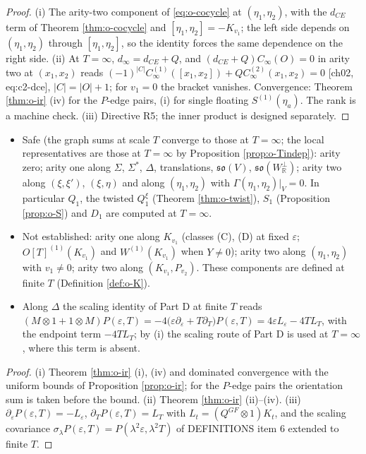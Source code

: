\begin{proof}
(i) The arity-two component of \eqref{eq:o-cocycle} at $(\eta_1,\eta_2)$, with the $d_{CE}$ term of Theorem \ref{thm:o-cocycle} and $[\eta_1,\eta_2]=-K_{v_1}$; the left side depends on $(\eta_1,\eta_2)$ through $[\eta_1,\eta_2]$, so the identity forces the same dependence on the right side. (ii) At $T=\infty$, $d_\infty=d_{CE}+Q$, and $(d_{CE}+Q)C_\infty(O)=0$ in arity two at $(x_1,x_2)$ reads $(-1)^{|C|}C_\infty^{(1)}([x_1,x_2])+QC_\infty^{(2)}(x_1,x_2)=0$ [ch02, eq:c2-dce], $|C|=|O|+1$; for $v_1=0$ the bracket vanishes. Convergence: Theorem \ref{thm:o-ir} (iv) for the $P$-edge pairs, (i) for single floating $S^{(1)}(\eta_a)$. The rank is a machine check. (iii) Directive R5; the inner product is designed separately.
\end{proof}

\begin{proposition}
\label{prop:o-Tsafe}
\begin{itemize}
\item[(i)] Safe (the graph sums at scale $T$ converge to those at $T=\infty$; the local representatives are those at $T=\infty$ by Proposition \ref{prop:o-Tindep}): arity zero; arity one along $\Sigma$, $\Sigma^*$, $\Delta$, translations, $\mathfrak{so}(V)$, $\mathfrak{so}(W_{\mathbb R}^\perp)$; arity two along $(\xi,\xi')$, $(\xi,\eta)$ and along $(\eta_1,\eta_2)$ with $\Gamma(\eta_1,\eta_2)|_V=0$. In particular $Q_1$, the twisted $Q_1^\xi$ (Theorem \ref{thm:o-twist}), $S_1$ (Proposition \ref{prop:o-S}) and $D_1$ are computed at $T=\infty$.
\item[(ii)] Not established: arity one along $K_{v_1}$ (classes (C), (D) at fixed $\varepsilon$; $O[T]^{(1)}(K_{v_1})$ and $W^{(1)}(K_{v_1})$ when $Y\neq0$); arity two along $(\eta_1,\eta_2)$ with $v_1\neq0$; arity two along $(K_{v_1},P_{v_2})$. These components are defined at finite $T$ (Definition \ref{def:o-K}).
\item[(iii)] Along $\Delta$ the scaling identity of Part D at finite $T$ reads $(M\otimes1+1\otimes M)P(\varepsilon,T)=-4\big(\varepsilon\partial_\varepsilon+T\partial_T\big)P(\varepsilon,T)=4\varepsilon L_\varepsilon-4TL_T$, with the endpoint term $-4TL_T$; by (i) the scaling route of Part D is used at $T=\infty$, where this term is absent.
\end{itemize}
\end{proposition}

\begin{proof}
(i) Theorem \ref{thm:o-ir} (i), (iv) and dominated convergence with the uniform bounds of Proposition \ref{prop:o-ir}; for the $P$-edge pairs the orientation sum is taken before the bound. (ii) Theorem \ref{thm:o-ir} (ii)--(iv). (iii) $\partial_\varepsilon P(\varepsilon,T)=-L_\varepsilon$, $\partial_TP(\varepsilon,T)=L_T$ with $L_t=(Q^{GF}\otimes1)K_t$, and the scaling covariance $\sigma_\lambda P(\varepsilon,T)=P(\lambda^2\varepsilon,\lambda^2T)$ of DEFINITIONS item 6 extended to finite $T$.
\end{proof}


